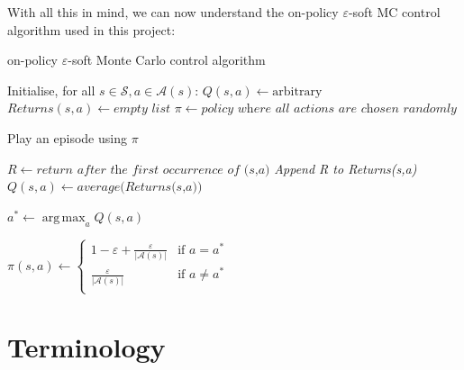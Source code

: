 \documentclass[11pt,a4paper,twoside,openright]{report}
\newcommand{\argmax}{\mathop{\mathrm{arg\,max}}}
\begin{document}
With all this in mind, we can now understand the on-policy $\varepsilon$-soft MC control algorithm used in this project:

\begin{algorithm}
    \caption{on-policy $\varepsilon$-soft Monte Carlo control algorithm} \label{sec:monteCarloPseudocode}
    \begin{algorithmic}[1]
        
        \State Initialise, for all $s \in \mathcal{S}, a \in \mathcal{A}(s)$:
            \State\hspace{\algorithmicindent} $Q(s,a) \gets \text{arbitrary}$
            \State\hspace{\algorithmicindent} $Returns(s,a) \gets \textit{empty list}$
            \State\hspace{\algorithmicindent} $\pi \gets \textit{policy where all actions are chosen randomly}$
        
            \State Play an episode using $\pi$
            
                 \State $R \gets \textit{return after the first occurrence of (s,a)}$
                 \State \textit{Append R to Returns(s,a)}
                 \State $Q(s,a) \gets average\textit{(Returns(s,a))}$
            \EndFor
            
                \State $a^{\ast} \gets \argmax_a Q(s,a)$
                
                    \State $\pi(s,a) \gets
                        \begin{cases}
                            1 - \varepsilon + \frac{\varepsilon}{|\mathcal{A}(s)|} & \text{if } a = a^{\ast} \\
                            \frac{\varepsilon}{|\mathcal{A}(s)|}  & \text{if } a \neq a^{\ast} \\
                        \end{cases}$
                \EndFor
            \EndFor
        \EndFor
        \EndProcedure
    \end{algorithmic}
\end{algorithm}


\section{Terminology}
\label{sec:Terminology}
\end{document}
